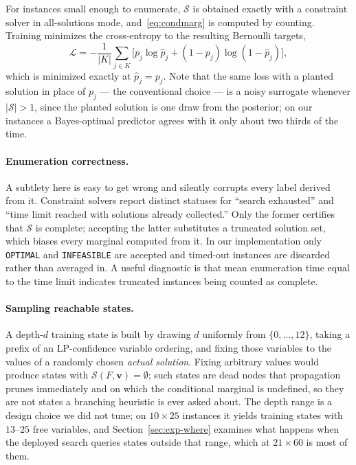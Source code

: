 \documentclass[final,5p,times,twocolumn]{elsarticle}
\newcommand{\SOL}{\mathcal{S}}
\begin{document}
For instances small enough to enumerate, $\SOL$ is obtained exactly with a constraint solver in all-solutions mode, and~\eqref{eq:condmarg} is computed by counting. Training minimizes the cross-entropy to the resulting Bernoulli targets,
\begin{equation}
\mathcal{L} = -\frac{1}{|K|}\sum_{j\in K}\Big[p_j\log\hat{p}_j + (1-p_j)\log(1-\hat{p}_j)\Big],
\label{eq:loss}
\end{equation}
which is minimized exactly at $\hat{p}_j = p_j$. Note that the same loss with a planted solution in place of $p_j$ --- the conventional choice --- is a noisy surrogate whenever $|\SOL|>1$, since the planted solution is one draw from the posterior; on our instances a Bayes-optimal predictor agrees with it only about two thirds of the time.

\paragraph{Enumeration correctness.} A subtlety here is easy to get wrong and silently corrupts every label derived from it. Constraint solvers report distinct statuses for ``search exhausted'' and ``time limit reached with solutions already collected.'' Only the former certifies that $\SOL$ is complete; accepting the latter substitutes a truncated solution set, which biases every marginal computed from it. In our implementation only \texttt{OPTIMAL} and \texttt{INFEASIBLE} are accepted and timed-out instances are discarded rather than averaged in. A useful diagnostic is that mean enumeration time equal to the time limit indicates truncated instances being counted as complete.

\paragraph{Sampling reachable states.} A depth-$d$ training state is built by drawing $d$ uniformly from $\{0,\dots,12\}$, taking a prefix of an LP-confidence variable ordering, and fixing those variables to the values of a randomly chosen \emph{actual solution}. Fixing arbitrary values would produce states with $\SOL(F,\mathbf{v})=\emptyset$; such states are dead nodes that propagation prunes immediately and on which the conditional marginal is undefined, so they are not states a branching heuristic is ever asked about. The depth range is a design choice we did not tune; on $10\times25$ instances it yields training states with $13$--$25$ free variables, and Section~\ref{sec:exp-where} examines what happens when the deployed search queries states outside that range, which at $21\times60$ is most of them.
\end{document}
